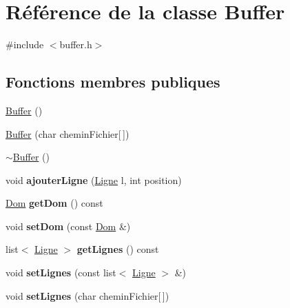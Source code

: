 \hypertarget{classBuffer}{
\section{Référence de la classe Buffer}
\label{classBuffer}
}


{\ttfamily \#include $<$buffer.h$>$}

\subsection*{Fonctions membres publiques}
\begin{DoxyCompactItemize}
\item 
\hyperlink{classBuffer_ae7ef2cd201190fde551dcb902627112b}{Buffer} ()
\item 
\hyperlink{classBuffer_a968f9c9b50fe02f7d76de200f78507b0}{Buffer} (char cheminFichier\mbox{[}$\,$\mbox{]})
\item 
\hyperlink{classBuffer_a59b8743e4a5f731bdd0c4185c9ef263b}{$\sim$Buffer} ()
\item 
\hypertarget{classBuffer_aaa71afa6da49b147a7060900288e67d3}{
void {\bfseries ajouterLigne} (\hyperlink{classLigne}{Ligne} l, int position)}
\label{classBuffer_aaa71afa6da49b147a7060900288e67d3}

\item 
\hypertarget{classBuffer_ae609f810be14bc51b479583957e8d6c1}{
\hyperlink{classDom}{Dom} {\bfseries getDom} () const }
\label{classBuffer_ae609f810be14bc51b479583957e8d6c1}

\item 
\hypertarget{classBuffer_a42ebf900f193564fed59440c8ec4286f}{
void {\bfseries setDom} (const \hyperlink{classDom}{Dom} \&)}
\label{classBuffer_a42ebf900f193564fed59440c8ec4286f}

\item 
\hypertarget{classBuffer_af7f5a6f316e5659e462874998c87921d}{
list$<$ \hyperlink{classLigne}{Ligne} $>$ {\bfseries getLignes} () const }
\label{classBuffer_af7f5a6f316e5659e462874998c87921d}

\item 
\hypertarget{classBuffer_a8d4cb25f19d9782d663d73ca460e1e37}{
void {\bfseries setLignes} (const list$<$ \hyperlink{classLigne}{Ligne} $>$ \&)}
\label{classBuffer_a8d4cb25f19d9782d663d73ca460e1e37}

\item 
\hypertarget{classBuffer_a122fe744cef772a83c6228195474171d}{
void {\bfseries setLignes} (char cheminFichier\mbox{[}$\,$\mbox{]})}
\label{classBuffer_a122fe744cef772a83c6228195474171d}


\end{DoxyCompactItemize}
